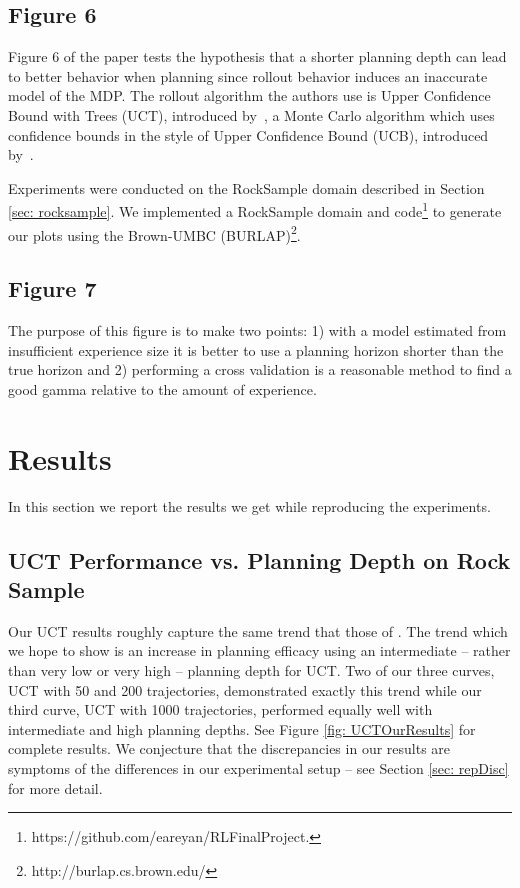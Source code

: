 \documentclass[11pt,twocolumn]{article}
\begin{document}
\subsection{Figure 6}
Figure 6 of the paper tests the hypothesis that a shorter planning depth can lead to better behavior when planning since rollout behavior induces an inaccurate model of the MDP. The rollout algorithm the authors use is Upper Confidence Bound with Trees (UCT), introduced by~\cite{kocsis2006bandit}, a Monte Carlo algorithm which uses confidence bounds in the style of Upper Confidence Bound (UCB), introduced by~\cite{auer2002finite}.

Experiments were conducted on the RockSample domain described in Section \ref{sec: rocksample}. We implemented a RockSample domain and code\footnote{https://github.com/eareyan/RLFinalProject.} to generate our plots using the Brown-UMBC (BURLAP)\footnote{http://burlap.cs.brown.edu/}.

\subsection{Figure 7}

The purpose of this figure is to make two points: 1) with a model estimated from insufficient experience size it is better to use a planning horizon shorter than the true horizon and 2) performing a cross validation is a reasonable method to find a good gamma relative to the amount of experience. 
\section{Results}
In this section we report the results we get while reproducing the experiments.

\subsection{UCT Performance vs. Planning Depth on Rock Sample}
Our UCT results roughly capture the same trend that those of \cite{jiang2015dependence}. The trend which we hope to show is an increase in planning efficacy using an intermediate -- rather than very low or very high -- planning depth for UCT. Two of our three curves, UCT with 50 and 200 trajectories, demonstrated exactly this trend while our third curve, UCT with 1000 trajectories, performed equally well with intermediate and high planning depths. See Figure \ref{fig: UCTOurResults} for complete results. We conjecture that the discrepancies in our results are symptoms of the differences in our experimental setup -- see Section \ref{sec: repDisc} for more detail.
\end{document}
